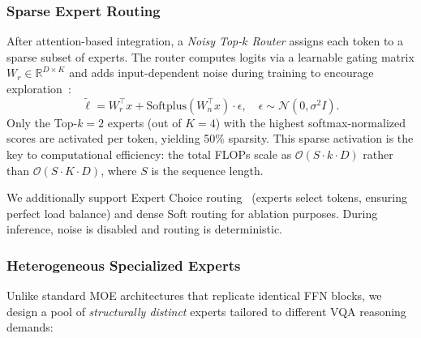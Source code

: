 \subsubsection{Sparse Expert Routing}
After attention-based integration, a \textit{Noisy Top-$k$ Router} assigns each token to a sparse subset of experts. The router computes logits via a learnable gating matrix $W_r \in \mathbb{R}^{D \times K}$ and adds input-dependent noise during training to encourage exploration~\cite{shazeer2017outrageously}:
\begin{equation}
    \tilde{\ell} = W_r^\top x + \mathrm{Softplus}(W_n^\top x)\cdot\epsilon, \quad \epsilon \sim \mathcal{N}(0, \sigma^2 I).
    \label{eq:noisy_routing}
\end{equation}
Only the Top-$k{=}2$ experts (out of $K{=}4$) with the highest softmax-normalized scores are activated per token, yielding 50\% sparsity. This sparse activation is the key to computational efficiency: the total FLOPs scale as $\mathcal{O}(S \cdot k \cdot D)$ rather than $\mathcal{O}(S \cdot K \cdot D)$, where $S$ is the sequence length.

We additionally support Expert Choice routing~\cite{zhou2022mixture} (experts select tokens, ensuring perfect load balance) and dense Soft routing for ablation purposes. During inference, noise is disabled and routing is deterministic.

\subsubsection{Heterogeneous Specialized Experts}
\label{sec:method:fusion:experts}

Unlike standard MOE architectures that replicate identical FFN blocks, we design a pool of \textit{structurally distinct} experts tailored to different VQA reasoning demands:

